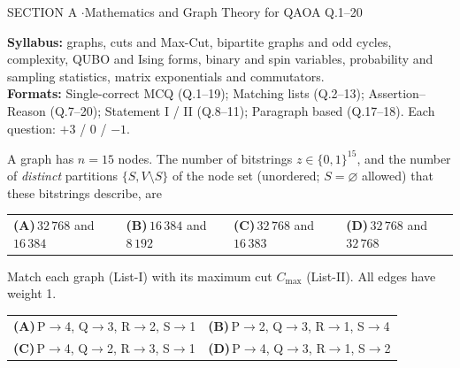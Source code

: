 \documentclass[11pt,a4paper]{article}
\newcommand{\optlabel}[1]{\textbf{(#1)}}
\newenvironment{qitem}[1]{\begin{list}{}{\setlength{\leftmargin}{3.3em}\setlength{\labelwidth}{3.1em}%
  \setlength{\labelsep}{0.2em}\setlength{\topsep}{3pt}\setlength{\parsep}{3pt}}\item[\textbf{Q.#1}\hfill]}{\end{list}}
\newcommand{\qsep}{\par\vspace{2pt}{\color{black!15}\hrule}\vspace{4pt}}
\begin{document}
\begin{sectionbanner}SECTION A \enspace$\cdot$\enspace Mathematics and Graph Theory for QAOA \hfill Q.1--20\end{sectionbanner}

{\small \textbf{Syllabus:} graphs, cuts and Max-Cut, bipartite graphs and odd cycles, complexity, QUBO and Ising forms, binary and spin variables, probability and sampling statistics, matrix exponentials and commutators.\\ \textbf{Formats:} Single-correct MCQ (Q.1--19); Matching lists (Q.2--13); Assertion--Reason (Q.7--20); Statement I / II (Q.8--11); Paragraph based (Q.17--18). Each question: $+3$ / $0$ / $-1$.}
\par\medskip

\begin{qitem}{1}
A graph has $n = 15$ nodes. The number of bitstrings $z \in \{0,1\}^{15}$, and the number of \emph{distinct}
partitions $\{S, V\setminus S\}$ of the node set (unordered; $S = \varnothing$ allowed) that these bitstrings describe, are
\par\smallskip\noindent\begin{tabularx}{\linewidth}{@{}*{4}{L}@{}}
\optlabel{A}\,$32\,768$ and $16\,384$ & \optlabel{B}\,$16\,384$ and $8\,192$ & \optlabel{C}\,$32\,768$ and $16\,383$ & \optlabel{D}\,$32\,768$ and $32\,768$
\end{tabularx}
\end{qitem}
\qsep

\begin{qitem}{2}
Match each graph (List-I) with its maximum cut $C_{\max}$ (List-II). All edges have weight 1.
\par\smallskip{}
\par\smallskip\noindent\begin{tabularx}{\linewidth}{@{}*{2}{L}@{}}
\optlabel{A}\,P$\to$4, Q$\to$3, R$\to$2, S$\to$1 & \optlabel{B}\,P$\to$2, Q$\to$3, R$\to$1, S$\to$4 \\[3pt]
\optlabel{C}\,P$\to$4, Q$\to$2, R$\to$3, S$\to$1 & \optlabel{D}\,P$\to$4, Q$\to$3, R$\to$1, S$\to$2
\end{tabularx}
\end{qitem}
\qsep
\end{document}
